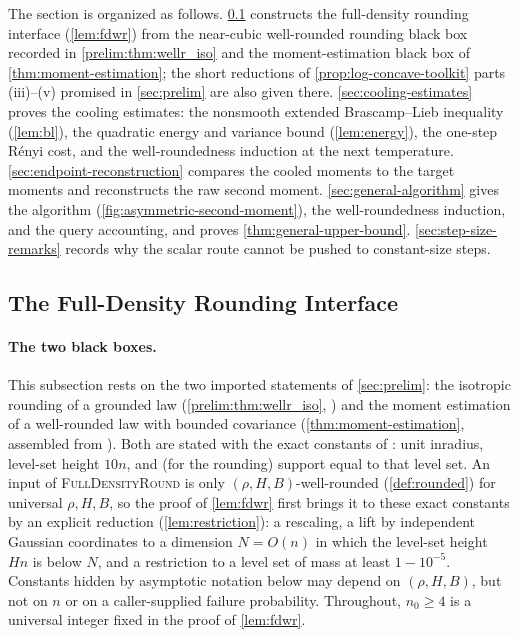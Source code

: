 \documentclass[11pt]{article}
\numberwithin{equation}{section}
\theoremstyle{definition}
\newcommand{\algname}[1]{\textnormal{\textsc{#1}}}
\begin{document}
The section is organized as follows.
\cref{sec:grounded-core} constructs the full-density rounding interface
(\cref{lem:fdwr}) from the near-cubic well-rounded rounding black box recorded
in \cref{prelim:thm:wellr_iso} and the moment-estimation black box of
\cref{thm:moment-estimation}; the short reductions of \cref{prop:log-concave-toolkit}
parts (iii)--(v) promised in \cref{sec:prelim} are also given there.
\cref{sec:cooling-estimates} proves the cooling estimates: the nonsmooth
extended Brascamp--Lieb inequality (\cref{lem:bl}), the quadratic energy and
variance bound (\cref{lem:energy}), the one-step R\'enyi cost, and the
well-roundedness induction at the next temperature.
\cref{sec:endpoint-reconstruction} compares the cooled moments to the target
moments and reconstructs the raw second moment.
\cref{sec:general-algorithm} gives the algorithm
(\cref{fig:asymmetric-second-moment}), the well-roundedness induction, and the
query accounting, and proves \cref{thm:general-upper-bound}.
\cref{sec:step-size-remarks} records why the scalar route cannot be pushed to
constant-size steps.

\subsection{The Full-Density Rounding Interface}
\label{sec:grounded-core}

\paragraph{The two black boxes.}
This subsection rests on the two imported statements of \cref{sec:prelim}:
the isotropic rounding of a grounded law (\cref{prelim:thm:wellr_iso},
\cite[Lemma~4.11]{KV25}) and the moment estimation of a well-rounded law with
bounded covariance (\cref{thm:moment-estimation}, assembled from
\cite[Theorem~3.16, Lemma~2.14, Lemma~2.9, and Lemma~4.6]{KV25}).
Both are stated with the exact constants of \cite[Assumption~4.4]{KV25}: unit
inradius, level-set height
$10n$, and (for the rounding) support equal to that level set.
An input of \algname{FullDensityRound} is only
$(\rho,H,B)$-well-rounded (\cref{def:rounded}) for universal
$\rho,H,B$, so the proof of \cref{lem:fdwr} first brings it to these exact
constants by an explicit reduction (\cref{lem:restriction}): a rescaling, a
lift by independent Gaussian coordinates to a dimension
$N=O(n)$ in which the level-set height
$Hn$ is below
$N$, and a restriction to a level set of mass at least
$1-10^{-5}$.
Constants hidden by asymptotic notation below may depend on $(\rho,H,B)$, but
not on
$n$ or on a caller-supplied failure probability.
Throughout, $n_0\geq4$ is a universal integer fixed in the proof of
\cref{lem:fdwr}.
\end{document}
